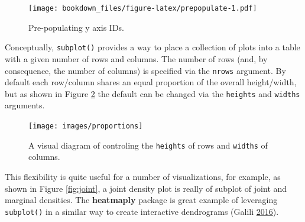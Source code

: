 \documentclass[12pt,]{isuthesis}
\newenvironment{Shaded}{\begin{snugshade}}{\end{snugshade}}
\newcommand{\KeywordTok}[1]{\textcolor[rgb]{0.13,0.29,0.53}{\textbf{{#1}}}}
\newcommand{\DataTypeTok}[1]{\textcolor[rgb]{0.13,0.29,0.53}{{#1}}}
\newcommand{\DecValTok}[1]{\textcolor[rgb]{0.00,0.00,0.81}{{#1}}}
\newcommand{\StringTok}[1]{\textcolor[rgb]{0.31,0.60,0.02}{{#1}}}
\newcommand{\OtherTok}[1]{\textcolor[rgb]{0.56,0.35,0.01}{{#1}}}
\newcommand{\NormalTok}[1]{{#1}}
\begin{document}
\begin{Shaded}
\end{Shaded}

\begin{figure}
\centering
\texttt{[image: bookdown\_files/figure-latex/prepopulate-1.pdf]}
\caption{\label{fig:prepopulate}Pre-populating y axis IDs.}
\end{figure}

Conceptually, \texttt{subplot()} provides a way to place a collection of
plots into a table with a given number of rows and columns. The number
of rows (and, by consequence, the number of columns) is specified via
the \texttt{nrows} argument. By default each row/column shares an equal
proportion of the overall height/width, but as shown in Figure
\ref{fig:proportions} the default can be changed via the
\texttt{heights} and \texttt{widths} arguments.

\begin{figure}
\centering
\texttt{[image: images/proportions]}
\caption{\label{fig:proportions}A visual diagram of controling the
\texttt{heights} of rows and \texttt{widths} of columns.}
\end{figure}

This flexibility is quite useful for a number of visualizations, for
example, as shown in Figure \ref{fig:joint}, a joint density plot is
really of subplot of joint and marginal densities. The
\textbf{heatmaply} package is great example of leveraging
\texttt{subplot()} in a similar way to create interactive dendrograms
(Galili \protect\hyperlink{ref-heatmaply}{2016}).
\end{document}
